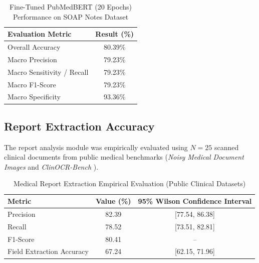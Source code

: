 \begin{table}[htbp]
\centering
\caption{Fine-Tuned PubMedBERT (20 Epochs) Performance on SOAP Notes Dataset}
\label{tab:pubmedbert_soap_evaluation}
\begin{tabular}{|l|c|}
\hline
\textbf{Evaluation Metric} & \textbf{Result (\%)} \\
\hline
Overall Accuracy & 80.39\% \\
Macro Precision & 79.23\% \\
Macro Sensitivity / Recall & 79.23\% \\
Macro F1-Score & 79.23\% \\
Macro Specificity & 93.36\% \\
\hline
\end{tabular}
\end{table}

\subsection{Report Extraction Accuracy}

The report analysis module was empirically evaluated using $N=25$ scanned clinical documents from public medical benchmarks (\textit{Noisy Medical Document Images} \cite{noisy_med_docs} and \textit{ClinOCR-Bench} \cite{clinocr_bench}).

\begin{table}[ht]
\centering
\caption{Medical Report Extraction Empirical Evaluation (Public Clinical Datasets)}
\label{tab:report_results}
\begin{tabular}{|l|c|c|}
\hline
\textbf{Metric} & \textbf{Value (\%)} & \textbf{95\% Wilson Confidence Interval} \\
\hline
Precision & 82.39 & [77.54, 86.38] \\
Recall & 78.52 & [73.51, 82.81] \\
F1-Score & 80.41 & -- \\
Field Extraction Accuracy & 67.24 & [62.15, 71.96] \\
\hline
\end{tabular}
\end{table}

